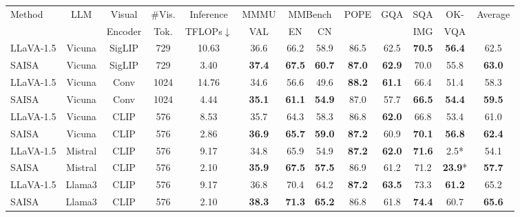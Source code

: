 \begin{table*}[t]
  \centering
  \resizebox{\textwidth}{!}
  {
  \renewcommand{\arraystretch}{1.0}
  { 
  \begin{tabular}{l|c|cc|c|ccccccc|c}
    \toprule
    \multirow{2}[2]{*}{Method} & \multirow{2}[2]{*}{LLM} & Visual & \#Vis. & Inference & MMMU & \multicolumn{2}{c}{MMBench} & \multirow{2}[2]{*}{POPE} & \multirow{2}[2]{*}{GQA} & SQA  & OK-  & \multirow{2}[2]{*}{Average} \\
          &       & Encoder & Tok. & TFLOPs$\downarrow$ & VAL & EN & CN    &         &    & IMG  & VQA &  \\
    \midrule
    LLaVA-1.5 & Vicuna & SigLIP & 729   & 10.63 & 36.6  & 66.2 & 58.9  & 86.5 & 62.5   & \textbf{70.5}   & \textbf{56.4} & 62.5 \\
    \rowcolor{cyan!20} SAISA & Vicuna & SigLIP & 729   & 3.40  & \textbf{37.4}  & \textbf{67.5} & \textbf{60.7}  & \textbf{87.0}  & \textbf{62.9}  & 70.0  & 55.8 & \textbf{63.0} \\
    \midrule
    LLaVA-1.5 & Vicuna & Conv & 1024  & 14.76 & 34.6  & 56.6 & 49.6  & \textbf{88.2}  & \textbf{61.1}  & 66.4  & 51.4 & 58.3 \\
    \rowcolor{cyan!20} SAISA & Vicuna & Conv & 1024  & 4.44  & \textbf{35.1}  & \textbf{61.1} & \textbf{54.9}  & 87.0 & 57.7   & \textbf{66.5}  & \textbf{54.4} & \textbf{59.5} \\
    \midrule
    LLaVA-1.5 & Vicuna & CLIP  & 576   & 8.53  & 35.7  & 64.3 & 58.3 & 86.8  & \textbf{62.0}  & 66.8  & 53.4 & 61.0 \\
    \rowcolor{cyan!20} SAISA & Vicuna & CLIP  & 576   & 2.86  & \textbf{36.9}  & \textbf{65.7} & \textbf{59.0} & \textbf{87.2} & 60.9   & \textbf{70.1}  & \textbf{56.8} & \textbf{62.4} \\
    \midrule
    LLaVA-1.5 & Mistral & CLIP  & 576   & 9.17  & 34.8  & 65.9 & 54.9  & \textbf{87.2}  & \textbf{62.0}   & \textbf{71.6}  & 2.5* & 54.1 \\
    \rowcolor{cyan!20} SAISA & Mistral & CLIP  & 576   & 2.10  & \textbf{35.9}  & \textbf{67.5} & \textbf{57.5}  & 86.9 & 61.2   & 71.2  & \textbf{23.9}* & \textbf{57.7} \\
    \midrule
    LLaVA-1.5 & Llama3 & CLIP  & 576   & 9.17  & 36.8  & 70.4 & 64.2 & \textbf{87.2}  & \textbf{63.5}  & 73.3  & \textbf{61.2} & 65.2 \\
    \rowcolor{cyan!20} SAISA & Llama3 & CLIP  & 576   & 2.10  & \textbf{38.3}  & \textbf{71.3} & \textbf{65.2} & 86.8  & 61.8  & \textbf{74.4}  & 60.7 & \textbf{65.6} \\

\end{tabular}}}
\end{table*}
